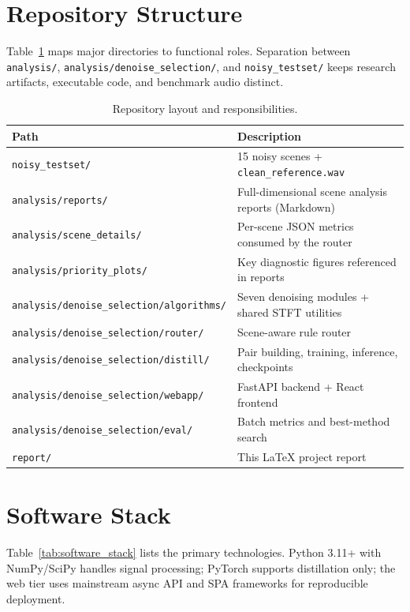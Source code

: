 \section{Repository Structure}
\label{sec:repo_structure}

Table~\ref{tab:repo_layout} maps major directories to functional roles. Separation between \texttt{analysis/}, \texttt{analysis/denoise\_selection/}, and \texttt{noisy\_testset/} keeps research artifacts, executable code, and benchmark audio distinct.

\begin{table}[H]
  \centering
  \caption{Repository layout and responsibilities.}
  \label{tab:repo_layout}
  \begin{tabularx}{\textwidth}{l X}
    \toprule
    \textbf{Path} & \textbf{Description} \\
    \midrule
    \texttt{noisy\_testset/} & 15 noisy scenes + \texttt{clean\_reference.wav} \\
    \texttt{analysis/reports/} & Full-dimensional scene analysis reports (Markdown) \\
    \texttt{analysis/scene\_details/} & Per-scene JSON metrics consumed by the router \\
    \texttt{analysis/priority\_plots/} & Key diagnostic figures referenced in reports \\
    \texttt{analysis/denoise\_selection/algorithms/} & Seven denoising modules + shared STFT utilities \\
    \texttt{analysis/denoise\_selection/router/} & Scene-aware rule router \\
    \texttt{analysis/denoise\_selection/distill/} & Pair building, training, inference, checkpoints \\
    \texttt{analysis/denoise\_selection/webapp/} & FastAPI backend + React frontend \\
    \texttt{analysis/denoise\_selection/eval/} & Batch metrics and best-method search \\
    \texttt{report/} & This LaTeX project report \\
    \bottomrule
  \end{tabularx}
\end{table}

\section{Software Stack}
\label{sec:software_stack}

Table~\ref{tab:software_stack} lists the primary technologies. Python 3.11+ with NumPy/SciPy handles signal processing; PyTorch supports distillation only; the web tier uses mainstream async API and SPA frameworks for reproducible deployment.

